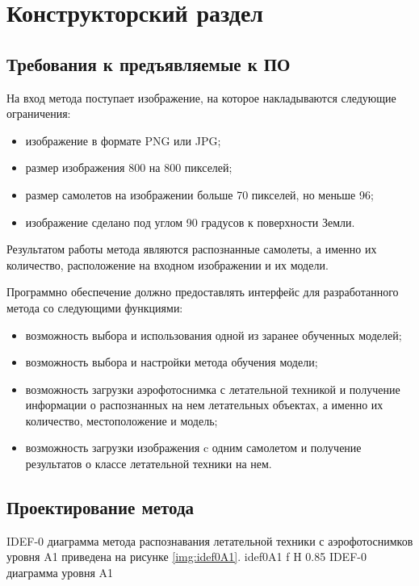 \chapter{Конструкторский раздел}

\section{Требования к предъявляемые к ПО}
На вход метода поступает изображение, на которое накладываются следующие ограничения:
\begin{itemize}
	\item изображение в формате PNG или JPG;
	\item размер изображения 800 на 800 пикселей;
	\item размер самолетов на изображении больше 70 пикселей, но меньше 96;
	\item изображение сделано под углом 90 градусов к поверхности Земли.
\end{itemize}

Результатом работы метода являются распознанные самолеты, а именно их количество, расположение на входном изображении и их модели.

Программно обеспечение должно предоставлять интерфейс для разработанного метода со следующими функциями:
\begin{itemize}
	\item возможность выбора и использования одной из заранее обученных моделей;
	\item возможность выбора и настройки метода обучения модели;
	\item возможность загрузки аэрофотоснимка с летательной техникой и получение информации о распознанных на нем летательных объектах, а именно их количество, местоположение и модель;
	\item возможность загрузки изображения c одним самолетом и получение результатов о классе летательной техники на нем.
\end{itemize}


\section{Проектирование метода}
IDEF-0 диаграмма метода распознавания летательной техники с аэрофотоснимков уровня A1 приведена на рисунке \ref{img:idef0A1}.
{idef0A1} %
{f} %
{H} %
{0.85\textwidth} %
{IDEF-0 диаграмма уровня A1} %

